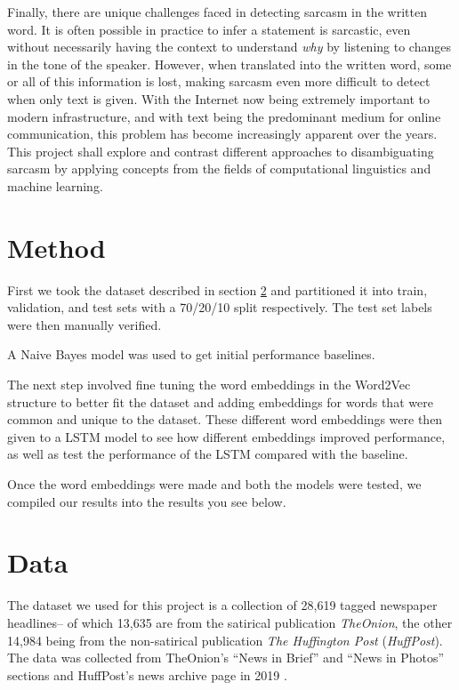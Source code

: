 \documentclass[11pt]{article}
\begin{document}
Finally, there are unique challenges faced in detecting sarcasm in the written
word. It is often possible in practice to infer a statement is sarcastic, even
without necessarily having the context to understand \textit{why} by listening
to changes in the tone of the speaker. However, when translated into the
written word, some or all of this information is lost, making sarcasm even more
difficult to detect when only text is given. With the Internet now being
extremely important to modern infrastructure, and with text being the
predominant medium for online communication, this problem has become
increasingly apparent over the years. This project shall explore and contrast
different approaches to disambiguating sarcasm by applying concepts from the
fields of computational linguistics and machine learning.

\section{Method}

First we took the dataset described in section \ref{sec:data}
and partitioned it into train, validation, and test sets with a 70/20/10 split respectively.
The test set labels were then manually verified.


A Naive Bayes model was used to get initial performance baselines.

The next step involved fine tuning the word embeddings in the
Word2Vec structure to better fit the dataset and adding embeddings
for words that were common and unique to the dataset.
These different word embeddings were then given to a
LSTM model to see how different embeddings improved performance,
as well as test the performance of the LSTM compared with the baseline.

Once the word embeddings were made and both the models were tested,
we compiled our results into the results you see below.

\section{Data}\label{sec:data}

The dataset we used for this project is a collection of 28,619 tagged
newspaper headlines-- of which 13,635 are from the satirical publication
\textit{TheOnion}, the other 14,984 being from the non-satirical publication
\textit{The Huffington Post} (\textit{HuffPost}). The data was collected from
TheOnion's ``News in Brief'' and ``News in Photos'' sections and HuffPost's
news archive page in 2019
\cite{misra2023Sarcasm}.
\end{document}
